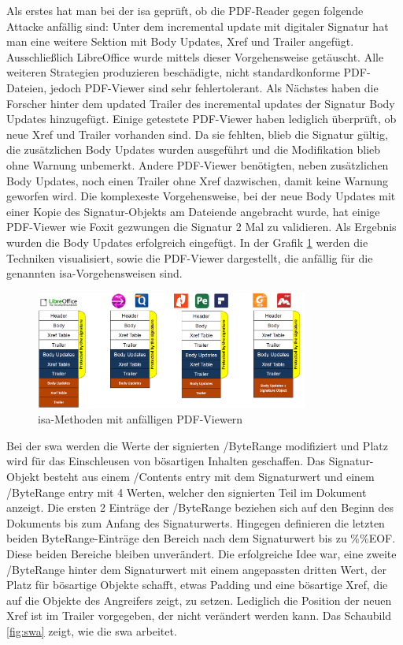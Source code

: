 Als erstes hat man bei der \gls{isa} geprüft, ob die PDF-Reader gegen folgende Attacke anfällig sind: Unter dem incremental update mit digitaler Signatur hat man eine weitere Sektion mit Body Updates, Xref und Trailer angefügt. Ausschließlich LibreOffice wurde mittels dieser Vorgehensweise getäuscht. Alle weiteren Strategien produzieren beschädigte, nicht standardkonforme PDF-Dateien, jedoch PDF-Viewer sind sehr fehlertolerant. Als Nächstes haben die Forscher hinter dem updated Trailer des incremental updates der Signatur Body Updates hinzugefügt. Einige getestete PDF-Viewer haben lediglich überprüft, ob neue Xref und Trailer vorhanden sind. Da sie fehlten, blieb die Signatur gültig, die zusätzlichen Body Updates wurden ausgeführt und die Modifikation blieb ohne Warnung unbemerkt. Andere PDF-Viewer benötigten, neben zusätzlichen Body Updates, noch einen Trailer ohne Xref dazwischen, damit keine Warnung geworfen wird. Die komplexeste Vorgehensweise, bei der neue Body Updates mit einer Kopie des Signatur-Objekts am Dateiende angebracht wurde, hat einige PDF-Viewer wie Foxit gezwungen die Signatur 2 Mal zu validieren. Als Ergebnis wurden die Body Updates erfolgreich eingefügt. In der Grafik \ref{fig:isa} werden die Techniken visualisiert, sowie die PDF-Viewer dargestellt, die anfällig für die genannten \gls{isa}-Vorgehensweisen sind.

\begin{figure}[!htbp]
	\centering
	\includegraphics[width=0.8\textwidth]{"images/isa.png"}
	\caption{\gls{isa}-Methoden mit anfälligen PDF-Viewern \cite{ccc-break-pdf-slides}}
	\label{fig:isa}
\end{figure}

Bei der \gls{swa} werden die Werte der signierten /ByteRange modifiziert und Platz wird für das Einschleusen von bösartigen Inhalten geschaffen. Das Signatur-Objekt besteht aus einem /Contents entry mit dem Signaturwert und einem /ByteRange entry mit 4 Werten, welcher den signierten Teil im Dokument anzeigt. Die ersten 2 Einträge der /ByteRange beziehen sich auf den Beginn des Dokuments bis zum Anfang des Signaturwerts. Hingegen definieren die letzten beiden ByteRange-Einträge den Bereich nach dem Signaturwert bis zu \%\%EOF. Diese beiden Bereiche bleiben unverändert. Die erfolgreiche Idee war, eine zweite /ByteRange hinter dem Signaturwert mit einem angepassten dritten Wert, der Platz für bösartige Objekte schafft, etwas Padding und eine bösartige Xref, die auf die Objekte des Angreifers zeigt, zu setzen. Lediglich die Position der neuen Xref ist im Trailer vorgegeben, der nicht verändert werden kann. Das Schaubild \ref{fig:swa} zeigt, wie die \gls{swa} arbeitet.

